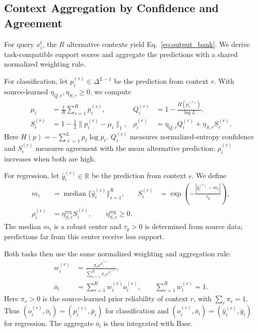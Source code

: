\subsection{Context Aggregation by Confidence and Agreement}
\label{sec:evidence_aggregation}

For query $x_i^t$, the $R$ alternative contexts yield Eq.~\eqref{eq:output_bank}.
We derive task-compatible support scores and aggregate the predictions with a
shared normalized weighting rule.

For classification, let $p_i^{(r)}\in\Delta^{L-1}$ be the prediction from
context $r$. With source-learned $\eta_{Q,r},\eta_{S,r}\geq0$, we compute
\begin{equation}
  \begin{aligned}
    \mu_i&=\frac{1}{R}\sum_{s=1}^{R}p_i^{(s)},
    &Q_i^{(r)}&=1-\frac{H(p_i^{(r)})}{\log L},\\
    S_i^{(r)}&=1-\frac12\lVert p_i^{(r)}-\mu_i\rVert_1,
    &\rho_i^{(r)}&=\eta_{Q,r}Q_i^{(r)}+\eta_{S,r}S_i^{(r)}.
  \end{aligned}
  \label{eq:classification_evidence}
\end{equation}
Here $H(p)=-\sum_{\ell=1}^{L}p_\ell\log p_\ell$.
$Q_i^{(r)}$ measures normalized-entropy confidence and $S_i^{(r)}$ measures
agreement with the mean alternative prediction; $\rho_i^{(r)}$ increases when
both are high.

For regression, let $\hat y_i^{(r)}\in\mathbb R$ be the prediction from
context $r$. We define
\begin{equation}
  \begin{aligned}
    m_i&=\operatorname{median}\{\hat y_i^{(s)}\}_{s=1}^{R},
    &S_i^{(r)}&=\exp\!\left(-\frac{|\hat y_i^{(r)}-m_i|}{\tau_y}\right),\\
    \rho_i^{(r)}&=\eta_{S,r}^{\mathrm{reg}}S_i^{(r)},
    \qquad \eta_{S,r}^{\mathrm{reg}}\geq0.
  \end{aligned}
  \label{eq:regression_evidence}
\end{equation}
The median $m_i$ is a robust center and $\tau_y>0$ is determined from source
data; predictions far from this center receive less support.

Both tasks then use the same normalized weighting and aggregation rule:
\begin{equation}
  \begin{aligned}
    w_i^{(r)}&=\frac{\pi_r e^{\rho_i^{(r)}}}
      {\sum_{s=1}^{R}\pi_s e^{\rho_i^{(s)}}},\\
    \bar o_i&=\sum_{r=1}^{R}w_i^{(r)}o_i^{(r)},
    \qquad \sum_{r=1}^{R}w_i^{(r)}=1.
  \end{aligned}
  \label{eq:task_aware_aggregation}
\end{equation}
Here $\pi_r>0$ is the source-learned prior reliability of context $r$, with
$\sum_r\pi_r=1$. Thus $(o_i^{(r)},\bar o_i)=(p_i^{(r)},\bar p_i)$ for
classification and $(o_i^{(r)},\bar o_i)=(\hat y_i^{(r)},\bar y_i)$ for
regression. The aggregate $\bar o_i$ is then integrated with Base.

